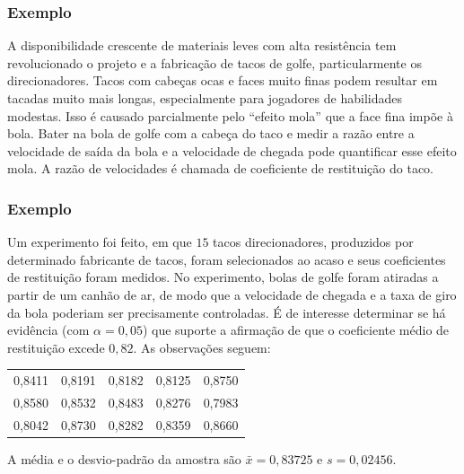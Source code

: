 \documentclass[14pt,aspectratio=1610]{beamer}
\newcommand{\bx}{\ensuremath{\bar{x}}}
\begin{document}
\begin{frame}{}
\frametitle{Exemplo}
\begin{block}{}
\justifying
A disponibilidade crescente de materiais leves com alta resistência tem revolucionado o projeto e a fabricação de tacos de golfe, particularmente os direcionadores. 
Tacos com cabeças ocas e faces muito finas podem resultar em tacadas muito mais longas, especialmente para jogadores de habilidades modestas. Isso é causado 
parcialmente pelo ``efeito mola'' que a face fina impõe à bola. Bater na bola de golfe com a cabeça do taco e medir a razão entre a velocidade de saída da bola e a 
velocidade de chegada pode quantificar esse efeito mola. A razão de velocidades é chamada de coeficiente de restituição do taco. 
\end{block}
\end{frame}

\begin{frame}{}
\frametitle{Exemplo}
\small
\begin{block}{}
\justifying
Um experimento foi feito, em que $15$ tacos direcionadores, produzidos por determinado fabricante de tacos, foram selecionados ao acaso e seus coeficientes de 
restituição foram medidos. No experimento, bolas de golfe foram atiradas a partir de um canhão de ar, de modo que a velocidade de chegada e a taxa de giro da bola 
poderiam ser precisamente controladas. É de interesse determinar se há evidência (com $\alpha = 0,05$) que suporte a afirmação de que o coeficiente médio de restituição 
excede $0,82.$ As observações seguem:
\begin{table}[]
\begin{tabular}{ccccc}
0,8411 &0,8191 &0,8182 &0,8125 &0,8750 \\
0,8580 &0,8532 &0,8483 &0,8276 &0,7983 \\
0,8042 &0,8730 &0,8282 &0,8359 &0,8660 
\end{tabular}
\end{table}
A média e o desvio-padrão da amostra são $\bx = 0,83725$ e $s = 0,02456.$
\end{block}
\end{frame}

\end{document}
